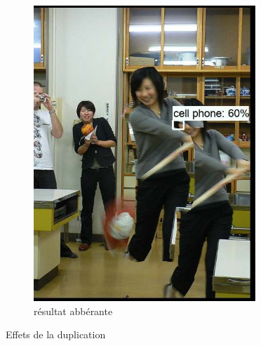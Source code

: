 \documentclass[12pt, letterpaper]{article}
\begin{document}
\begin{figure}[H]
\begin{subfigure}[b]{0.4\linewidth}
        \includegraphics[width=\linewidth]{img/fig19.png}
        \caption{résultat abbérante}
      \end{subfigure}
    \caption{Effets de la duplication}
    \label{fig:L15}
\end{figure}
\end{document}
